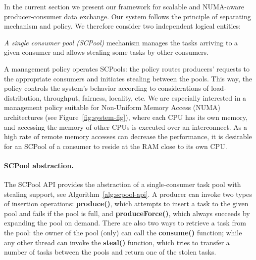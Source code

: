 \negspace
In the current section we present our framework for scalable and NUMA-aware producer-consumer data exchange. 
Our system follows the principle of separating mechanism and policy.
We therefore consider two independent logical entities: 
\snegspace
\begin{enum*}
	\item \emph{A single consumer pool (SCPool)} mechanism manages the tasks arriving to a given consumer and allows stealing some tasks by other consumers.
	\item A management policy operates SCPools: the policy routes producers' requests to the appropriate consumers and initiates stealing between the pools. This way, the policy controls the system's behavior according to considerations of load-distribution, throughput, fairness, locality, etc.
	We are especially interested in a management policy suitable for Non-Uniform Memory Access (NUMA) architectures (see Figure~\ref{fig:system-fig}), where each CPU has its own memory, and accessing the memory of other CPUs is executed over an interconnect. As a high rate of remote memory accesses can decrease the performance, it is desirable for an SCPool of a consumer to reside at the RAM close to its own CPU. 
\end{enum*} 

\negspace
\paragraph{SCPool abstraction.}

The SCPool API provides the abstraction of a single-consumer task pool with stealing support, see Algorithm~\ref{alg:scpool-api}.
A producer can invoke two types of insertion operations: {\bf produce()}, which attempts to insert a task to the given pool and fails if the pool is full, and {\bf produceForce()}, which always succeeds by expanding the pool on demand.
There are also two ways to retrieve a task from the pool: the owner of the pool (only) can call the {\bf consume()} function; while any other thread can invoke the {\bf steal()} function, which tries to transfer a number of tasks between the pools and return one of the stolen tasks. 


